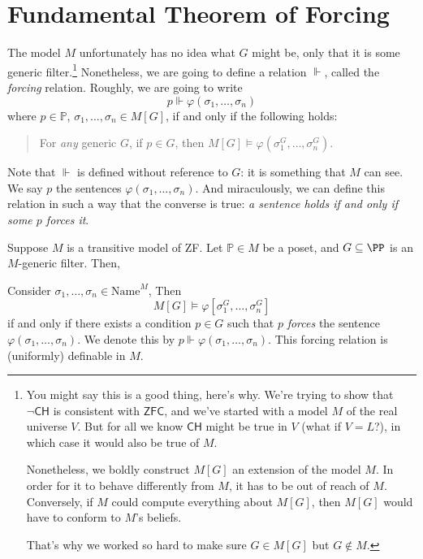 \documentclass[11pt]{scrreprt}
\newcommand{\CH}{\mathsf{CH}}
\newcommand{\ZFC}{\mathsf{ZFC}}
\newcommand{\Name}{\text{Name}}
\newcommand{\Po}{\mathbb P}
\begin{document}
\section{Fundamental Theorem of Forcing}
The model $M$ unfortunately has no idea what $G$ might be,
only that it is some generic filter.\footnote{%
	You might say this is a good thing, here's why.
	We're trying to show that $\neg \CH$ is consistent with $\ZFC$,
	and we've started with a model $M$ of the real universe $V$.
	But for all we know $\CH$ might be true in $V$ (what if $V=L$?),
	in which case it would also be true of $M$.

	Nonetheless, we boldly construct $M[G]$ an extension of the model $M$.
	In order for it to behave differently from $M$, it has to be out of reach of $M$.
	Conversely, if $M$ could compute everything about $M[G]$,
	then $M[G]$ would have to conform to $M$'s beliefs.

	That's why we worked so hard to make sure $G \in M[G]$ but $G \notin M$.
}
Nonetheless, we are going to define a relation $\Vdash$, called the \emph{forcing} relation.
Roughly, we are going to write
\[ p \Vdash \varphi(\sigma_1, \dots, \sigma_n) \]
where $p \in \Po$, $\sigma_1, \dots, \sigma_n \in M[G]$, if and only if the following holds:
\begin{quote}
	For \emph{any} generic $G$,
	if $p \in G$,
	then $M[G] \vDash \varphi(\sigma_1^G, \dots, \sigma_n^G)$.
\end{quote}
Note that $\Vdash$ is defined without reference to $G$:
it is something that $M$ can see.
We say $p$  the sentences $\varphi(\sigma_1, \dots, \sigma_n)$.
And miraculously, we can define this relation in such a way that the converse is true:
\emph{a sentence holds if and only if some $p$ forces it}.


\begin{theorem}
	Suppose $M$ is a transitive model of ZF.
	Let $\Po \in M$ be a poset, and $G \subseteq \PP$ is an $M$-generic filter.
	Then,
	\begin{enumerate}[(1)]
		\ii Consider $\sigma_1, \dots, \sigma_n \in \Name^M$,
		Then
		\[ M[G] \vDash \varphi[\sigma_1^G, \dots, \sigma_n^G] \]
		if and only if there exists a condition $p \in G$
		such that $p$ \emph{forces} the sentence $\varphi(\sigma_1, \dots, \sigma_n)$.
		We denote this by $p \Vdash \varphi(\sigma_1, \dots, \sigma_n)$.
		\ii This forcing relation is (uniformly) definable in $M$.
	\end{enumerate}
\end{theorem}
\end{document}
